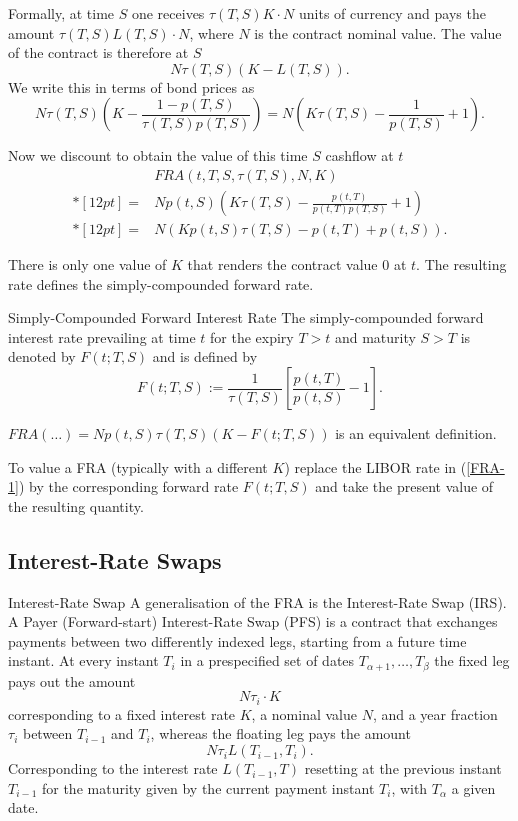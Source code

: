 	Formally, at time $S$ one receives $\tau(T,S)K\cdot N$ units of
	currency and pays the amount $\tau(T,S)L(T,S)\cdot N$, where $N$
	is the contract nominal value. The value of the contract is
	therefore at $S$
		\begin{equation}\label{FRA-1}
		N\tau(T,S)(K-L(T,S)).
		\end{equation}
	We write this in terms of bond prices as
		$$
		N\tau(T,S)\left(K-\frac{1-p(T,S)}{\tau(T,S)p(T,S)}\right)=N\left(K\tau(T,S)-\frac{1}{p(T,S)}+1\right).
		$$
	
	Now we discount to obtain the value of this time $S$ cashflow at $t$
		$$
		\begin{array}{ll}
		& FRA(t,T,S,\tau(T,S),N,K) \\*[12pt] = & Np(t,S)\left(K\tau(T,S)-\frac{p(t,T)}{p(t,T)p(T,S)}+1\right) \\*[12pt]
			= &N(K p(t,S)\tau(T,S)-p(t,T)+p(t,S)).
		\end{array}
		$$
	
	There is only one value of $K$ that renders the contract value $0$
	at $t$. The resulting rate defines the simply-compounded forward
	rate.


Simply-Compounded Forward Interest Rate
	The simply-compounded forward interest rate prevailing at time $t$
	for the expiry $T>t$ and maturity $S>T$ is denoted by $F(t;T,S)$
	and is defined by
	\begin{equation}
	F(t;T,S):=\frac{1}{\tau(T,S)} \left[\frac{p(t,T)}{p(t,S)}-1\right].
	\end{equation}

	$FRA(\ldots)=Np(t,S)\tau(T,S)(K-F(t; T,S))$ is an
	equivalent definition.
	
	To value a FRA (typically with a different $K$) replace the LIBOR rate in (\ref{FRA-1}) by
	the corresponding forward rate $F(t;T,S)$ and take the present
	value of the resulting quantity.

\subsection{Interest-Rate Swaps}
Interest-Rate Swap
	A generalisation
	of the FRA is the Interest-Rate Swap (IRS). A Payer (Forward-start)
	Interest-Rate Swap (PFS) is a contract that exchanges payments
	between two differently indexed legs, starting from a future time
	instant. At every instant $T_i$ in a prespecified set of dates
	$T_{\alpha+1},\ldots ,T_{\beta}$ the fixed leg pays out the amount
		$$
		N\tau_i\cdot K
		$$
	corresponding to a fixed interest rate $K$, a
	nominal value $N$, and a year fraction $\tau_i$ between $T_{i-1}$
	and $T_i$, whereas the floating leg pays the amount
		$$
		N\tau_i L(T_{i-1},T_i).
		$$
	Corresponding to the interest rate
	$L(T_{i-1},T)$ resetting at the previous instant $T_{i-1}$ for the
	maturity given by the current payment instant $T_i$, with
	$T_{\alpha}$ a given date.


